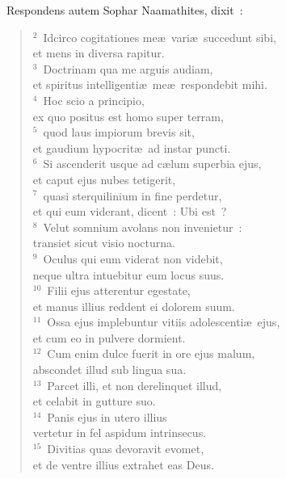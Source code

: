 ~\lettrine[lines=10,image=true,loversize=0.05,lraise=-0.03]{R}{}espondens autem Sophar Naamathites, dixit~:
\begin{flushleft}\begin{verse}\vspace{6pt}${}^{2}$~Idcirco cogitationes me\ae\ vari\ae\ succedunt sibi,\\ et mens in diversa rapitur.\\
${}^{3}$~Doctrinam qua me arguis audiam,\\ et spiritus intelligenti\ae\ me\ae\ respondebit mihi.\\
${}^{4}$~Hoc scio a principio,\\ ex quo positus est homo super terram,\\
${}^{5}$~quod laus impiorum brevis sit,\\ et gaudium hypocrit\ae\ ad instar puncti.\\
${}^{6}$~Si ascenderit usque ad c\ae lum superbia ejus,\\ et caput ejus nubes tetigerit,\\
${}^{7}$~quasi sterquilinium in fine perdetur,\\ et qui eum viderant, dicent~: Ubi est~?\\
${}^{8}$~Velut somnium avolans non invenietur~:\\ transiet sicut visio nocturna.\\
${}^{9}$~Oculus qui eum viderat non videbit,\\ neque ultra intuebitur eum locus suus.\\
${}^{10}$~Filii ejus atterentur egestate,\\ et manus illius reddent ei dolorem suum.\\
${}^{11}$~Ossa ejus implebuntur vitiis adolescenti\ae\ ejus,\\ et cum eo in pulvere dormient.\\
${}^{12}$~Cum enim dulce fuerit in ore ejus malum,\\ abscondet illud sub lingua sua.\\
${}^{13}$~Parcet illi, et non derelinquet illud,\\ et celabit in gutture suo.\\
${}^{14}$~Panis ejus in utero illius\\ vertetur in fel aspidum intrinsecus.\\
${}^{15}$~Divitias quas devoravit evomet,\\ et de ventre illius extrahet eas Deus.\\

\end{verse}
\end{flushleft}
